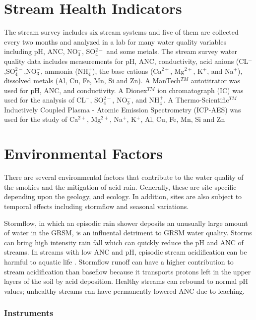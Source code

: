 \section{Stream Health Indicators}
The stream survey includes six stream systems and five of them are collected every two months and analyzed in a lab for many water quality variables including pH, ANC, NO$_3^-$, SO$_4^{2-}$ and some metals.  %
The stream survey water quality data includes measurements for pH, ANC, conductivity, acid anions (CL$^-$,SO$_4^{2-}$,NO$_3^-$, ammonia (NH$_4^+$), the base cations (Ca$^{2+}$, Mg$^{2+}$, K$^+$, and Na$^+$), dissolved metals (Al, Cu, Fe, Mn, Si and Zn).  
A ManTech$^{TM}$ autotitrator was used for pH, ANC, and conductivity.  
A Dionex$^{TM}$ ion chromatograph (IC) was used for the analysis of CL$^-$, SO$_4^{2-}$, NO$_3^-$, and NH$_4^+$.  A Thermo-Scientific$^{TM}$ Inductively Coupled Plasma - Atomic Emission Spectrometry (ICP-AES) was used for the study of Ca$^{2+}$, Mg$^{2+}$, Na$^+$, K$^+$, Al, Cu, Fe, Mn, Si and Zn

\section{Environmental Factors} %
\label{sec:IntroEnvFactors}
There are several environmental factors that contribute to the water quality of the smokies and the mitigation of acid rain.
Generally, these are site specific depending upon the geology, and ecology.
In addition, sites are also subject to temporal effects including stormflow and seasonal variations.

Stormflow, in which an episodic rain shower deposits an unusually large amount of water in the GRSM, is an influental detriment to GRSM water quality. 
Storms can bring high intensity rain fall which can quickly reduce the pH and ANC of streams. 
In streams with low ANC and pH, episodic stream acidification can be harmful to aquatic life \citep{neff2009physiological}. 
Stormflow runoff can have a higher contribution to stream acidification than baseflow because it transports protons left in the upper layers of the soil by acid deposition. 
Healthy streams can rebound to normal pH values; unhealthy streams can have permanently lowered ANC due to leaching.  



\subsubsection{Instruments}